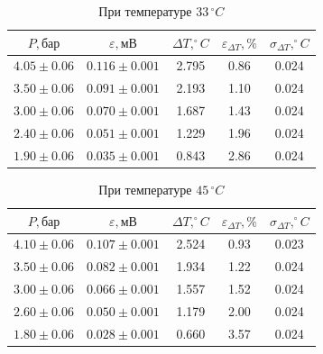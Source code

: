 \documentclass[a4paper,12pt]{article}
\begin{document}
\begin{table}[h!]
    \centering
    \begin{tabular}{|c|c|c|c|c|}
        \hline
        $P, \text{бар}$ & $\varepsilon, \text{мВ}$ & $\Delta T, ^\circ C$ & $\varepsilon_{\Delta T}, \%$ & $\sigma_{\Delta T}, ^\circ C$ \\
        \hline
        $4.05 \pm 0.06$ & $0.116 \pm 0.001$ & 2.795 & 0.86 & 0.024 \\ \hline
        $3.50 \pm 0.06$ & $0.091 \pm 0.001$ & 2.193 & 1.10 & 0.024 \\ \hline
        $3.00 \pm 0.06$ & $0.070 \pm 0.001$ & 1.687 & 1.43 & 0.024 \\ \hline
        $2.40 \pm 0.06$ & $0.051 \pm 0.001$ & 1.229 & 1.96 & 0.024 \\ \hline
        $1.90 \pm 0.06$ & $0.035 \pm 0.001$ & 0.843 & 2.86 & 0.024 \\ \hline
    \end{tabular}
    \caption{При температуре $33\,^\circ C$}
    \label{tab:33C}
\end{table}

\begin{table}[h!]
    \centering
    \begin{tabular}{|c|c|c|c|c|}
        \hline
        $P, \text{бар}$ & $\varepsilon, \text{мВ}$ & $\Delta T, ^\circ C$ & $\varepsilon_{\Delta T}, \%$ & $\sigma_{\Delta T}, ^\circ C$ \\
        \hline
        $4.10 \pm 0.06$ & $0.107 \pm 0.001$ & 2.524 & 0.93 & 0.023 \\ \hline
        $3.50 \pm 0.06$ & $0.082 \pm 0.001$ & 1.934 & 1.22 & 0.024 \\ \hline
        $3.00 \pm 0.06$ & $0.066 \pm 0.001$ & 1.557 & 1.52 & 0.024 \\ \hline
        $2.60 \pm 0.06$ & $0.050 \pm 0.001$ & 1.179 & 2.00 & 0.024 \\ \hline
        $1.80 \pm 0.06$ & $0.028 \pm 0.001$ & 0.660 & 3.57 & 0.024 \\ \hline
    \end{tabular}
    \caption{При температуре $45\,^\circ C$}
    \label{tab:45C}
\end{table}
\end{document}
